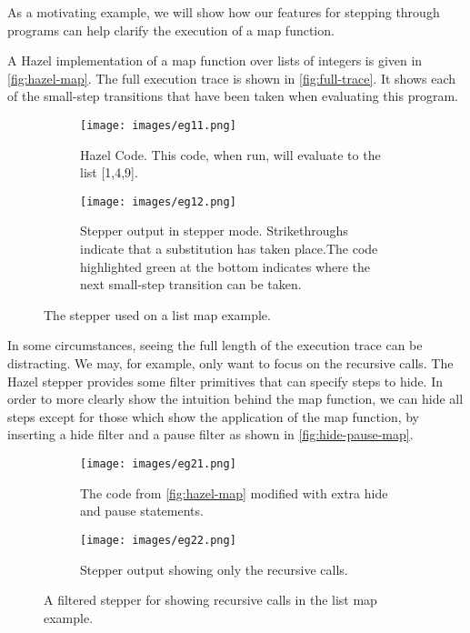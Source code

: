 As a motivating example, we will show how our features for stepping
through programs can help clarify the execution of a map function.

A Hazel implementation of a map function over lists of integers is
given in \autoref{fig:hazel-map}. The full execution trace is shown in
\autoref{fig:full-trace}. It shows each of the small-step transitions
that have been taken when evaluating this program.

\begin{figure}
  \centering
  \begin{minipage}{.40\linewidth}
    \begin{subfigure}{\linewidth}
      \texttt{[image: images/eg11.png]}
      \caption{Hazel Code. This code, when run, will evaluate to the list [1,4,9].}
      \label{fig:hazel-map}
    \end{subfigure}
  \end{minipage}
  \hfill
  \begin{minipage}{.57\linewidth}
    \begin{subfigure}{\linewidth}
      \texttt{[image: images/eg12.png]}
      \caption{Stepper output in stepper mode. Strikethroughs indicate that a substitution has taken place.The code highlighted green at the bottom indicates where the next small-step transition can be taken.}
      \label{fig:full-trace}
    \end{subfigure}
  \end{minipage}
  \caption{The stepper used on a list map example.}
\end{figure}

In some circumstances, seeing the full length of the execution trace
can be distracting. We may, for example, only want to focus on the
recursive calls. The Hazel stepper provides some filter primitives
that can specify steps to hide. In order to more clearly show the
intuition behind the map function, we can hide all steps except for
those which show the application of the map function, by inserting a
hide filter and a pause filter as shown in
\autoref{fig:hide-pause-map}.

\begin{figure}
  \centering
  \begin{minipage}{.40\linewidth}
    \begin{subfigure}{\linewidth}
      \texttt{[image: images/eg21.png]}
      \caption{The code from \autoref{fig:hazel-map} modified with extra hide and pause statements.}
      \label{fig:hide-pause-map}
    \end{subfigure}
  \end{minipage}
  \hfill
  \begin{minipage}{.57\linewidth}
    \begin{subfigure}{\linewidth}
      \texttt{[image: images/eg22.png]}
      \caption{Stepper output showing only the recursive calls.}
      \label{fig:full-trace}
    \end{subfigure}
  \end{minipage}
  \caption{A filtered stepper for showing recursive calls in the list map example.}
\end{figure}

